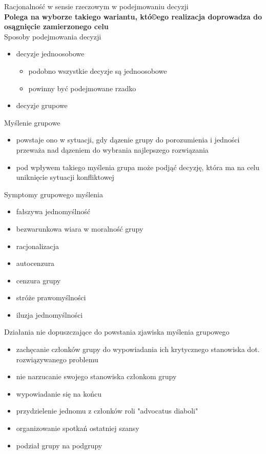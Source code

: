 \documentclass[a4paper,10pt]{report}
\begin{document}
Racjonalność w sensie rzeczowym w podejmowaniu decyzji\\
\textbf{Polega na wyborze takiego wariantu, któ©ego realizacja doprowadza do osągnięcie zamierzonego celu}\\

\noindent Sposoby podejmowania decyzji
\begin{itemize}
	\item decyzje jednoosobowe
	\begin{itemize}
		\item podobno wszystkie decyzje są jednoosobowe
		\item powinny być podejmowane rzadko 
	\end{itemize}
	\item decyzje grupowe
\end{itemize}

\noindent Myślenie grupowe
\begin{itemize}
	\item powstaje ono w sytuacji, gdy dązenie grupy do porozumienia i jedności przeważa nad dązeniem do wybrania najlepszego rozwiązania
	\item pod wpływem takiego myślenia grupa może podjąć decyzję, która ma na celu uniknięcie sytuacji konfliktowej
\end{itemize}

\noindent Symptomy grupowego myślenia
\begin{itemize}
	\item fałszywa jednomyślność
	\item bezwarunkowa wiara w moralność grupy
	\item racjonalizacja
	\item autocenzura
	\item cenzura grupy
	\item stróże prawomyślności
	\item iluzja jednomyślności
\end{itemize}

\noindent Działania nie dopuszczające do powstania zjawiska myślenia grupowego
\begin{itemize}
	\item zachęcanie członków grupy do wypowiadania ich krytycznego stanowiska dot. rozwiązywanego problemu
	\item nie narzucanie swojego stanowiska członkom grupy
	\item wypowiadanie się na końcu
	\item przydzielenie jednomu z członków roli "advocatus diaboli"
	\item organizowanie spotkań ostatniej szansy
	\item podział grupy na podgrupy
\end{itemize}
\end{document}
